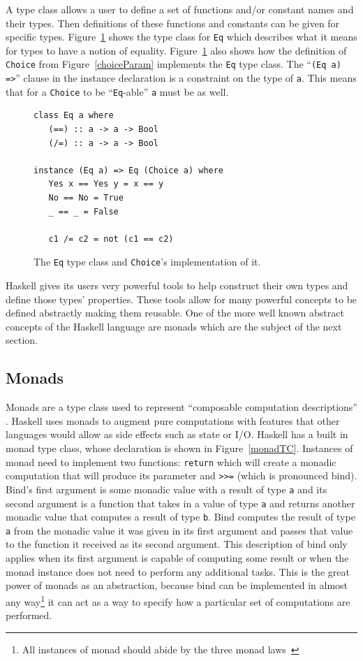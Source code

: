 A type class allows a user to define a set of functions and/or constant names and their types. Then definitions of these functions and constants can be given for specific types. Figure~\ref{choiceEq} shows the type class for \texttt{Eq} which describes what it means for types to have a notion of equality. Figure~\ref{choiceEq} also shows how the definition of \texttt{Choice} from Figure~\ref{choiceParam} implements the \texttt{Eq} type class. The ``\texttt{(Eq a) =>}'' clause in the instance declaration is a constraint on the type of \texttt{a}. This means that for a \texttt{Choice} to be ``\texttt{Eq}-able'' \texttt{a} must be as well.

\begin{figure}[t]
\begin{lstlisting}
class Eq a where
   (==) :: a -> a -> Bool
   (/=) :: a -> a -> Bool
	
instance (Eq a) => Eq (Choice a) where
   Yes x == Yes y = x == y
   No == No = True
   _ == _ = False
	
   c1 /= c2 = not (c1 == c2) 
\end{lstlisting}
\caption{The \texttt{Eq} type class and \texttt{Choice}'s implementation of it.}
\label{choiceEq}
\end{figure}

Haskell gives its users very powerful tools to help construct their own types and define those types' properties. These tools allow for many powerful concepts to be defined abstractly making them reusable. One of the more well known abstract concepts of the Haskell language are monads which are the subject of the next section.

\subsection{Monads}

Monads are a type class used to represent ``composable computation descriptions''\\ \citep{haskellWikiMonad}. Haskell uses monads to augment pure computations with features that other languages would allow as side effects such as state or I/O. Haskell has a built in monad type class, whose declaration is shown in Figure~\ref{monadTC}. Instances of monad need to implement two functions: \texttt{return} which will create a monadic computation that will produce its parameter and \texttt{>>=} (which is pronounced bind). Bind's first argument is some monadic value with a result of type \texttt{a} and its second argument is a function that takes in a value of type \texttt{a} and returns another monadic value that computes a result of type \texttt{b}. Bind computes the result of type \texttt{a} from the monadic value it was given in its first argument and passes that value to the function it received as its second argument. This description of bind only applies when its first argument is capable of computing some result or when the monad instance does not need to perform any additional tasks. This is the great power of monads as an abstraction, because bind can be implemented in almost any way\footnote{All instances of monad should abide by the three monad laws~\citep{wadler1995Monads}} it can act as a way to specify how a particular set of computations are performed. 

